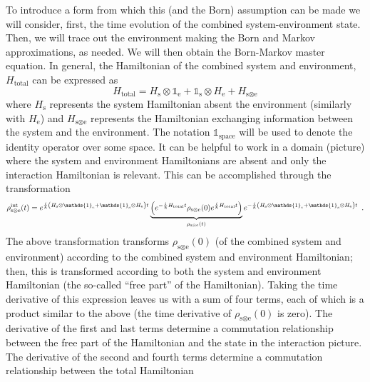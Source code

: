 \documentclass{article}
\begin{document}
To introduce a form from which this (and the Born) assumption can be made we
will consider, first, the time evolution of the combined system-environment
state. Then, we will trace out the environment making the Born and Markov
approximations, as needed. We will then obtain the Born-Markov master equation.
In general, the Hamiltonian of the combined system and environment, $
H_{\textrm{total}} $ can be
expressed as
\begin{equation}
   H_{\textrm{total}} = H_{\textrm{s}} \otimes \mathds{1}_{\textrm{e}} +
   \mathds{1}_{\textrm{s}} \otimes H_{\textrm{e}} + H_{\textrm{s} \otimes \textrm{e}}
\end{equation}
where $ H_{\textrm{s}} $ represents the system Hamiltonian absent the
environment (similarly with $ H_{\textrm{e}} $) and $ H_{\textrm{s} \otimes
\textrm{e}} $ represents the Hamiltonian exchanging information between the
system and the environment. The notation $ \mathds{1}_{\textrm{space}} $ will be
used to denote the identity operator over some space. It can be helpful to work
in a domain (picture) where the system and environment Hamiltonians are absent
and only the interaction Hamiltonian is relevant. This can be accomplished
through the transformation
\[
   \rho^{\textrm{int}}_{\textrm{s} \otimes \textrm{e}}(t)
   = e^{\frac{i}{\hbar} \left( H_{\textrm{s}} \otimes \mathds{1}_{\textrm{e}} +
      \mathds{1}_{\textrm{s}} \otimes H_{\textrm{e}}\right) t }
      \underbrace{\left( e^{- \frac{i}{\hbar} H_{\textrm{total}} t } \rho_{\textrm{s} \otimes \textrm{e}}(0)
      e^{ \frac{i}{\hbar} H_{\textrm{total}} t }\right)}_{\rho_{\textrm{s}\otimes
      \textrm{e}}(t)}
      e^{-\frac{i}{\hbar}\left( H_{\textrm{s}} \otimes \mathds{1}_{\textrm{e}} +
   \mathds{1}_{\textrm{s}} \otimes H_{\textrm{e}}\right) t } \enskip.
\]
The above transformation transforms $ \rho_{\textrm{s} \otimes \textrm{e}}(0) $ (of the combined system
and environment) according to the combined system and environment Hamiltonian;
then, this is transformed according to both the system and environment
Hamiltonian (the so-called ``free part'' of the Hamiltonian). Taking the time
derivative of this expression leaves us with a sum of four terms, each of which
is a product similar to the above (the time derivative of $
\rho_{\textrm{s}\otimes \textrm{e}}(0) $ is zero). The derivative of the first and last terms
determine a commutation relationship between the free part of the Hamiltonian
and the state in the interaction picture. The derivative of the second and
fourth terms determine a commutation relationship between the total Hamiltonian
\end{document}
